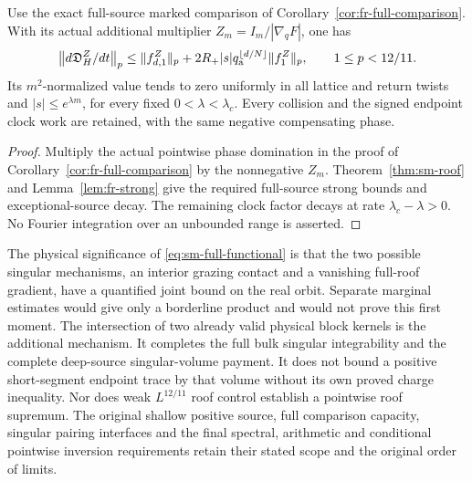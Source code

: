 \begin{corollary}
\label{cor:sm-marked}
Use the exact full-source marked comparison of
Corollary~\ref{cor:fr-full-comparison}.  With its actual additional
multiplier $Z_m=I_m/|\nabla_qF|$, one has
\begin{equation}\label{eq:sm-marked}
 \left\|d\mathfrak D_H^Z/dt\right\|_p
   \le\|f^Z_{d,1}\|_p+
     2R_+|s|q_{\rm a}^{\lfloor d/N\rfloor}\|f^Z_1\|_p,
                  \qquad1\le p<12/11.
\end{equation}
Its $m^2$-normalized value tends to zero uniformly in all lattice
and return twists and $|s|\le e^{\lambda m}$, for every fixed
$0<\lambda<\lambda_c$.  Every collision and the signed endpoint
clock work are retained, with the same negative compensating phase.
\end{corollary}
\begin{proof}
Multiply the actual pointwise phase domination in the proof of
Corollary~\ref{cor:fr-full-comparison} by the nonnegative $Z_m$.
Theorem~\ref{thm:sm-roof} and Lemma~\ref{lem:fr-strong} give
the required full-source strong bounds and exceptional-source
decay.  The remaining clock factor decays at rate
$\lambda_c-\lambda>0$.  No Fourier integration over an
unbounded range is asserted.
\end{proof}

The physical significance of \eqref{eq:sm-full-functional} is that
the two possible singular mechanisms, an interior grazing contact
and a vanishing full-roof gradient, have a quantified joint bound
on the real orbit.  Separate marginal estimates would give only
a borderline product and would not prove this first moment.
The intersection of two already valid physical block kernels is
the additional mechanism.  It completes the full bulk singular
integrability and the complete deep-source singular-volume payment.
It does not bound a positive short-segment endpoint trace by that
volume without its own proved charge inequality.  Nor does weak
$L^{12/11}$ roof control establish a pointwise roof supremum.
The original shallow positive source, full comparison capacity,
singular pairing interfaces and the final spectral, arithmetic and
conditional pointwise inversion requirements retain their stated
scope and the original order of limits.
